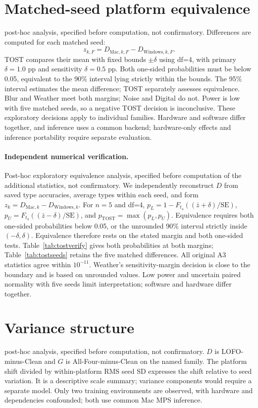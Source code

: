 \documentclass[twoside,a4paper,11pt]{article}
\newcommand{\posthoc}{post-hoc analysis, specified before computation, not confirmatory}
\begin{document}
\section{Matched-seed platform equivalence}
\label{supp:equivalence}
\posthoc. Differences are computed for each matched seed: \[z_{k,F}=D_{\mathrm{Mac},k,F}-D_{\mathrm{Windows},k,F}.\] TOST compares their mean with fixed bounds $\pm\delta$ using df=4, with primary $\delta=1.0$ pp and sensitivity $\delta=0.5$ pp. Both one-sided probabilities must be below 0.05, equivalent to the 90\% interval lying strictly within the bounds. The 95\% interval estimates the mean difference; TOST separately assesses equivalence. Blur and Weather meet both margins; Noise and Digital do not. Power is low with five matched seeds, so a negative TOST decision is inconclusive. These exploratory decisions apply to individual families. Hardware and software differ together, and inference uses a common backend; hardware-only effects and inference portability require separate evaluation.

\paragraph{Independent numerical verification.}
Post-hoc exploratory equivalence analysis, specified before computation of the additional statistics, not confirmatory. We independently reconstruct $D$ from saved type accuracies, average types within each seed, and form $z_k=D_{\mathrm{Mac},k}-D_{\mathrm{Windows},k}$. For $n=5$ and df=4, $p_L=1-F_{t_4}((\bar z+\delta)/\mathrm{SE})$, $p_U=F_{t_4}((\bar z-\delta)/\mathrm{SE})$, and $p_{\mathrm{TOST}}=\max(p_L,p_U)$. Equivalence requires both one-sided probabilities below 0.05, or the unrounded 90\% interval strictly inside $(-\delta,\delta)$. Equivalence therefore rests on the stated margin and both one-sided tests. Table~\ref{tab:tostverify} gives both probabilities at both margins; Table~\ref{tab:tostseeds} retains the five matched differences. All original A3 statistics agree within $10^{-11}$. Weather's sensitivity-margin decision is close to the boundary and is based on unrounded values. Low power and uncertain paired normality with five seeds limit interpretation; software and hardware differ together.



\section{Variance structure}
\label{supp:variance}
\posthoc. $D$ is LOFO-minus-Clean and $G$ is All-Four-minus-Clean on the named family. The platform shift divided by within-platform RMS seed SD expresses the shift relative to seed variation. It is a descriptive scale summary; variance components would require a separate model. Only two training environments are observed, with hardware and dependencies confounded; both use common Mac MPS inference.

\end{document}
